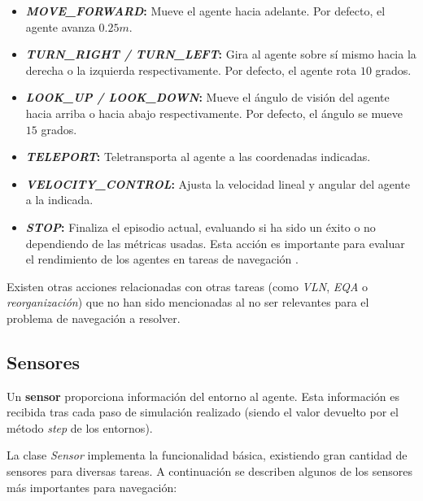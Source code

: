 \begin{itemize}
	\item \textbf{\textit{MOVE{\_}FORWARD}:} Mueve el agente hacia adelante. Por defecto, el agente avanza $0.25m$.
	\item \textbf{\textit{TURN{\_}RIGHT / TURN{\_}LEFT}:} Gira al agente sobre sí mismo hacia la derecha o la izquierda respectivamente. Por defecto, el agente rota $10$ grados.
	\item \textbf{\textit{LOOK{\_}UP / LOOK{\_}DOWN}:} Mueve el ángulo de visión del agente hacia arriba o hacia abajo respectivamente. Por defecto, el ángulo se mueve $15$ grados.
	\item \textbf{\textit{TELEPORT}:} Teletransporta al agente a las coordenadas indicadas.
	\item \textbf{\textit{VELOCITY{\_}CONTROL}:} Ajusta la velocidad lineal y angular del agente a la indicada.
	\item \textbf{\textit{STOP}:} Finaliza el episodio actual, evaluando si ha sido un éxito o no dependiendo de las métricas usadas. Esta acción es importante para evaluar el rendimiento de los agentes en tareas de navegación \cite{DBLP:journals/corr/abs-1807-06757}.
\end{itemize}

Existen otras acciones relacionadas con otras tareas (como \textit{VLN}, \textit{EQA} o \textit{reorganización}) que no han sido mencionadas al no ser relevantes para el problema de navegación a resolver.

\subsection{Sensores}

Un \textbf{sensor} proporciona información del entorno al agente. Esta información es recibida tras cada paso de simulación realizado (siendo el valor devuelto por el método \textit{step} de los entornos).

La clase \textit{Sensor} implementa la funcionalidad básica, existiendo gran cantidad de sensores para diversas tareas. A continuación se describen algunos de los sensores más importantes para navegación:

